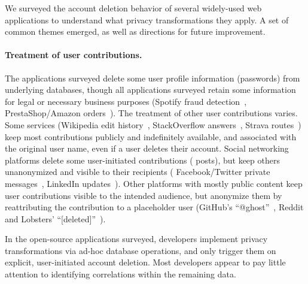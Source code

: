 %
We surveyed the account deletion behavior of several widely-used web applications
to understand what privacy transformations they apply.
%
A set of common themes emerged, as well as directions for future improvement.


\paragraph{Treatment of user contributions.}

The applications surveyed delete some user profile information (\eg passwords)
from underlying databases, though all applications surveyed retain some
information for legal or necessary business purposes (\eg Spotify fraud
detection~\cite{spotify:privacy}, PrestaShop/Amazon
orders~\cite{amazon:privacy, prestashop:privacy}). The treatment of other user
contributions varies.
%
Some services (\eg Wikipedia edit
history~\cite{wikipedia:privacy}, StackOverflow
answers~\cite{stackoverflow:privacy}, Strava routes~\cite{strava:privacy})
keep most contributions publicly and indefinitely available, and associated with the
original user name, even if a user deletes their account.
%
Social networking platforms delete some user-initiated contributions (\eg
posts), but keep others unanonymized and visible to their recipients (\eg
Facebook/Twitter private messages~\cite{facebook:privacy, twitter:privacy},
LinkedIn updates~\cite{linkedin:privacy}).
%
Other platforms with mostly public content keep user contributions visible to the intended
audience, but anonymize them by reattributing the contribution to a placeholder user
(\eg GitHub's ``@ghost''~\cite{github:privacy}, Reddit and Lobsters'
``[deleted]''~\cite{reddit:privacy, lobsters:privacy}).
%
%

In the open-source applications surveyed, developers implement privacy transformations
via ad-hoc database operations, and only trigger them on explicit, user-initiated account
deletion.
%
Most developers appear to pay little attention to identifying correlations
within the remaining data.
%


